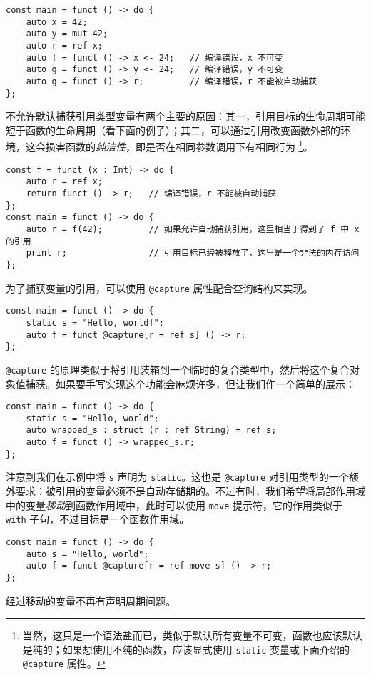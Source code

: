 \begin{lstlisting}
const main = funct () -> do {
	auto x = 42;
	auto y = mut 42;
	auto r = ref x;
	auto f = funct () -> x <- 24;	// 编译错误，x 不可变
	auto g = funct () -> y <- 24;	// 编译错误，y 不可变
	auto g = funct () -> r;			// 编译错误，r 不能被自动捕获
};
\end{lstlisting}

不允许默认捕获引用类型变量有两个主要的原因：其一，引用目标的生命周期可能短于函数的生命周期（看下面的例子）；其二，可以通过引用改变函数外部的环境，这会损害函数的\emph{纯洁性}，即是否在相同参数调用下有相同行为 \footnote{当然，这只是一个语法盐而已，类似于默认所有变量不可变，函数也应该默认是纯的；如果想使用不纯的函数，应该显式使用 \lstinline!static! 变量或下面介绍的 \lstinline!@capture! 属性。}。

\begin{lstlisting}
const f = funct (x : Int) -> do {
	auto r = ref x;
	return funct () -> r;	// 编译错误，r 不能被自动捕获
};
const main = funct () -> do {
	auto r = f(42);			// 如果允许自动捕获引用，这里相当于得到了 f 中 x 的引用
	print r;				// 引用目标已经被释放了，这里是一个非法的内存访问
};
\end{lstlisting}

为了捕获变量的引用，可以使用 \lstinline!@capture! 属性配合查询结构来实现。

\begin{lstlisting}
const main = funct () -> do {
	static s = "Hello, world!";
	auto f = funct @capture[r = ref s] () -> r;
};
\end{lstlisting}

\lstinline!@capture! 的原理类似于将引用装箱到一个临时的复合类型中，然后将这个复合对象值捕获。如果要手写实现这个功能会麻烦许多，但让我们作一个简单的展示：

\begin{lstlisting}
const main = funct () -> do {
	static s = "Hello, world";
	auto wrapped_s : struct (r : ref String) = ref s;
	auto f = funct () -> wrapped_s.r;
};
\end{lstlisting}

注意到我们在示例中将 \lstinline!s! 声明为 \lstinline!static!。这也是 \lstinline!@capture! 对引用类型的一个额外要求：被引用的变量必须不是自动存储期的。不过有时，我们希望将局部作用域中的变量\emph{移动}到函数作用域中，此时可以使用 \lstinline!move! 提示符，它的作用类似于 \lstinline!with! 子句，不过目标是一个函数作用域。

\begin{lstlisting}
const main = funct () -> do {
	auto s = "Hello, world";
	auto f = funct @capture[r = ref move s] () -> r;
};
\end{lstlisting}

经过移动的变量不再有声明周期问题。

